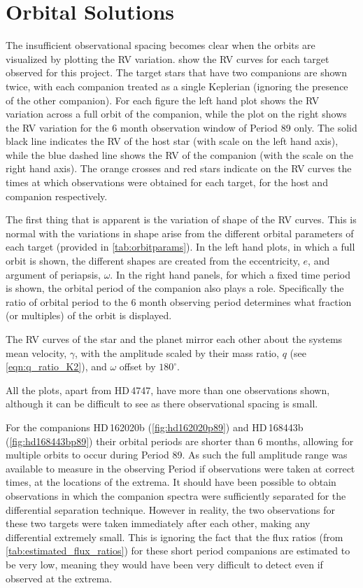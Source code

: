 
\section{Orbital Solutions}
\label{sec:orbtial_diagrams}
The insufficient observational spacing becomes clear when the orbits are visualized by plotting the {RV} variation.
 show the {RV} curves for each target observed for this project.
The target stars that have two companions are shown twice, with each companion treated as a single Keplerian (ignoring the presence of the other companion).
For each figure the left hand plot shows the {RV} variation across a full orbit of the companion, while the plot on the right shows the {RV} variation for the 6 month observation window of {Period 89} only.
The solid black line indicates the {RV} of the host star (with scale on the left hand axis), while the blue dashed line shows the {RV} of the companion (with the scale on the right hand axis).
The orange crosses and red stars indicate on the {RV} curves the times at which observations were obtained for each target, for the host and companion respectively.

The first thing that is apparent is the variation of shape of the {RV} curves.
This is normal with the variations in shape arise from the different orbital parameters of each target (provided in \cref{tab:orbitparams}).
In the left hand plots, in which a full orbit is shown, the different shapes are created from the eccentricity, \(e\), and argument of periapsis, \(\omega\).
In the right hand panels, for which a fixed time period is shown, the orbital period of the companion also plays a role.
Specifically the ratio of orbital period to the 6 month observing period determines what fraction (or multiples) of the orbit is displayed.

The {RV} curves of the star and the planet mirror each other about the systems mean velocity, \(\gamma\), with the amplitude scaled by their mass ratio, \(q\) (see \cref{eqn:q_ratio_K2}), and \(\omega\) offset by \(180^\circ\).

All the plots, apart from {HD\,4747}, have more than one observations shown, although it can be difficult to see as there observational spacing is small.

For the companions {HD\,162020}b (\cref{fig:hd162020p89}) and {HD\,168443}b (\cref{fig:hd168443bp89}) their orbital periods are shorter than 6 months, allowing for multiple orbits to occur during {Period 89}.
As such the full amplitude range was available to measure in the observing Period if observations were taken at correct times, at the locations of the extrema.
It should have been possible to obtain observations in which the companion spectra were sufficiently separated for the differential separation technique.
However in reality, the two observations for these two targets were taken immediately after each other, making any differential extremely small.
This is ignoring the fact that the flux ratios (from \cref{tab:estimated_flux_ratios}) for these short period companions are estimated to be very low, meaning they would have been very difficult to detect even if observed at the extrema.

